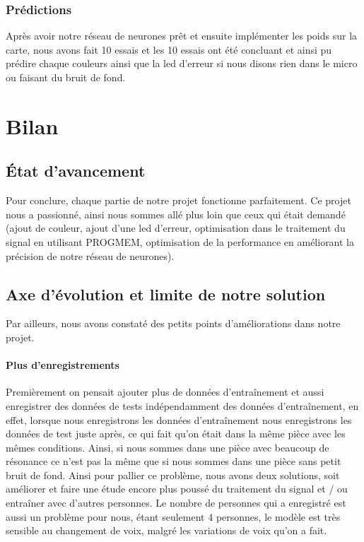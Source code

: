 \documentclass[a4paper,11pt]{article}
\begin{document}
\subsubsection{Prédictions}
Après avoir notre réseau de neurones prêt et ensuite implémenter les poids sur la carte, nous avons fait 10 essais et les 10 essais ont été concluant et ainsi pu prédire chaque couleurs ainsi que la led d'erreur si nous disons rien dans le micro ou faisant du bruit de fond.
	
\section{Bilan}	
\subsection{État d’avancement}
Pour conclure, chaque partie de notre projet fonctionne parfaitement. Ce projet nous a passionné, ainsi nous sommes allé plus loin que ceux qui était demandé (ajout de couleur, ajout d'une led d'erreur, optimisation dans le traitement du signal en utilisant PROGMEM, optimisation de la performance en améliorant la précision de notre réseau de neurones). 
			
\subsection{Axe d'évolution et limite de notre solution}
Par ailleurs, nous avons constaté des petits points d'améliorations dans notre projet.
\paragraph{Plus d'enregistrements} 
Premièrement on pensait ajouter plus de données d'entraînement et aussi enregistrer des données de tests indépendamment des données d'entraînement, en effet, lorsque nous enregistrons les données d'entraînement nous enregistrons les données de test juste après, ce qui fait qu'on était dans la même pièce avec les mêmes conditions. Ainsi, si nous sommes dans une pièce avec beaucoup de résonance ce n'est pas la même que si nous sommes dans une pièce sans petit bruit de fond. Ainsi pour pallier ce problème, nous avons deux solutions, soit améliorer et faire une étude encore plus poussé du traitement du signal et / ou entraîner avec d'autres personnes. Le nombre de personnes qui a enregistré est aussi un problème pour nous, étant seulement 4 personnes, le modèle est très sensible au changement de voix, malgré les variations de voix qu'on a fait. 
\end{document}
